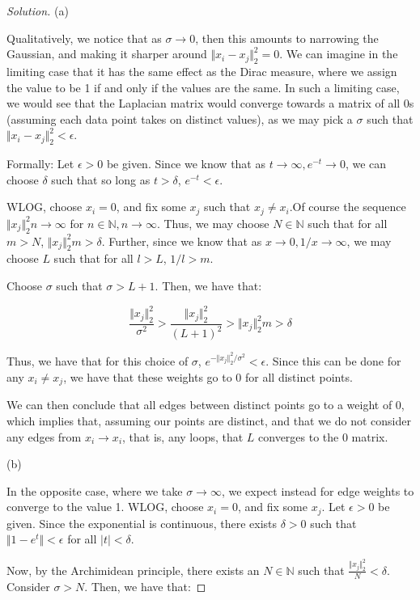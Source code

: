 \documentclass[10pt]{article}
\begin{document}
\begin{proof}[Solution]

(a)

Qualitatively, we notice that as $\sigma \to 0$, then this amounts to narrowing the Gaussian, and making it sharper around $\Vert x_i - x_j \Vert_2^2 = 0$. We can imagine in the limiting case that it has the same effect as the Dirac measure, where we assign the value to be 1 if and only if the values are the same. In such a limiting case, we would see that the Laplacian matrix would converge towards a matrix of all 0s (assuming each data point takes on distinct values), as we may pick a $\sigma$ such that $\Vert x_i - x_j \Vert_2^2 < \epsilon$.

Formally: Let $\epsilon > 0$ be given. Since we know that as $t \to \infty, e^{-t} \to 0$, we can choose $\delta$ such that so long as $t > \delta$, $e^{-t} < \epsilon$.

WLOG, choose $x_i = 0$, and fix some $x_j$ such that $x_j \not = x_i$.Of course the sequence $\Vert x_j \Vert_2^2 n \to \infty$ for $n \in \mathbb{N}, n \to \infty$. Thus, we may choose $N \in \mathbb{N}$ such that for all $m > N$, $\Vert x_j \Vert_2^2 m > \delta$. Further, since we know that as $x \to 0, 1/x \to \infty$, we may choose $L$ such that for all $l > L$, $1/l > m$.

Choose $\sigma$ such that  $\sigma > L+1$. Then, we have that:

$$ \frac{\Vert x_j \Vert_2^2}{\sigma^2} > \frac{\Vert x_j \Vert_2^2}{(L+1)^2} > \Vert x_j \Vert_2^2 m > \delta$$

Thus, we have that for this choice of $\sigma$, $e^{-\Vert x_j \Vert_2^2/\sigma^2} < \epsilon$. Since this can be done for any $x_i \not = x_j$, we have that these weights go to 0 for all distinct points.

We can then conclude that all edges between distinct points go to a weight of 0, which implies that, assuming our points are distinct, and that we do not consider any edges from $x_i \to x_i$, that is, any loops, that $L$ converges to the 0 matrix.

(b)

In the opposite case, where we take $\sigma \to \infty$, we expect instead for edge weights to converge to the value 1. WLOG, choose $x_i = 0$, and fix some $x_j$. Let $\epsilon > 0$ be given. Since the exponential is continuous, there exists $\delta > 0$ such that $ \Vert 1  - e^{t} \Vert < \epsilon$ for all $|t| < \delta$.

Now, by the Archimidean principle, there exists an $N \in \mathbb{N}$ such that $\frac{\Vert x_j\Vert_2^2 }{N} < \delta$. Consider $\sigma > N$. Then, we have that:


\end{proof}
\end{document}
